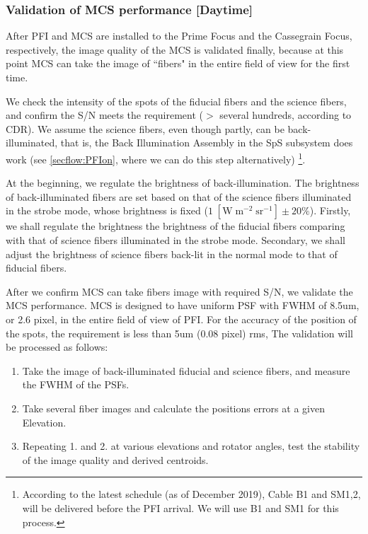 \subsubsection{Validation of MCS performance [Daytime]}\label{secflow:MCSperf}


After PFI and MCS are installed to the Prime Focus and the Cassegrain  Focus, respectively, the image quality of the MCS is validated finally, because at this point MCS can take the image of ``fibers" in the entire field of view for the first time.

We check the intensity of the spots of the fiducial fibers and the science fibers, and confirm the S/N meets the requirement ($>$ several hundreds, according to CDR).
We assume the science fibers, even though partly, can be back-illuminated, that is, the Back Illumination Assembly in the SpS subsystem does work (see \ref{secflow:PFIon}, where we can do this step alternatively) \footnote{According to the latest schedule (as of December 2019), Cable B1 and SM1,2, will be delivered before the PFI arrival. We will use B1 and SM1 for this process.}.

At the beginning, we regulate the brightness of back-illumination.
The brightness of back-illuminated fibers are set based on that of the science fibers illuminated in the strobe mode, whose brightness is fixed ($1 \; \mathrm{[W\;m^{-2} \; sr^{-1}]} \pm 20 \%$).
Firstly, we shall regulate the brightness the brightness of the fiducial fibers comparing with that of science fibers illuminated in the strobe mode.
Secondary, we shall adjust the brightness of science fibers back-lit in the normal mode to that of fiducial fibers. 


After we confirm MCS can take fibers image with required S/N, we validate the MCS performance.
MCS is designed to have uniform PSF with FWHM of 8.5um, or 2.6 pixel, in the entire field of view of PFI.
For the accuracy of the position of the spots, the requirement is less than 5um (0.08 pixel) rms, 
The validation will be processed as follows:
\begin{enumerate}
\item Take the image of back-illuminated fiducial and science fibers, and measure the FWHM of the PSFs.
\item Take several fiber images and calculate the positions errors at a given Elevation. 
\item Repeating 1. and 2. at various elevations and rotator angles, test the stability of the image quality and derived centroids.
\end{enumerate}

